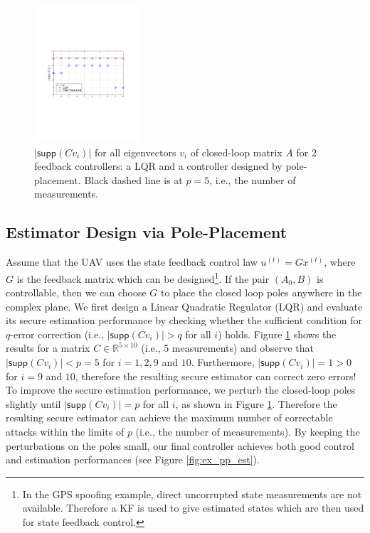 \documentclass[../../thesis.tex]{subfiles}
\begin{document}
\begin{figure}[b]
\center
\includegraphics[width=0.35\textwidth]{chapters/se_linear/figures/supp_ev_2.pdf}
\caption{$ \lvert \textsf{supp} (C v_i) \rvert $ for all eigenvectors $v_i$ of closed-loop matrix $A$ for 2 feedback controllers: a LQR and a controller designed by pole-placement. Black dashed line is at $p = 5$, i.e., the number of measurements.}
\label{fig:ex_pole}
\end{figure}

\subsection{Estimator Design via Pole-Placement}

Assume that the UAV uses the state feedback control law $u^{(t)} = G x^{(t)}$, where $G$ is the feedback matrix which can be designed\footnote{In the GPS spoofing example, direct uncorrupted state measurements are not available. Therefore a KF is used to give estimated states which are then used for state feedback control.}. If the pair $(A_0, B)$ is controllable, then we can choose $G$ to place the closed loop poles anywhere in the complex plane. We first design a Linear Quadratic Regulator (LQR) and evaluate its secure estimation performance by checking whether the sufficient condition for $q$-error correction  (i.e., $\lvert \textsf{supp} (C v_i) \rvert > q$ for all $i$) holds. 
Figure \ref{fig:ex_pole} shows the results for a matrix $C \in \mathbb{R}^{5\times 10}$ (i.e., 5 measurements) and observe that $\lvert \textsf{supp} (C v_i) \rvert < p = 5$ for $i=1,2,9$ and $10$. Furthermore, $\lvert \textsf{supp} (C v_i) \rvert = 1 > 0$ for $i = 9$ and $10$, therefore the resulting secure estimator can correct zero errors!
To improve the secure estimation performance, we perturb the closed-loop poles slightly until $\lvert \textsf{supp} (C v_i) \rvert = p$ for all $i$, as shown in Figure \ref{fig:ex_pole}. Therefore the resulting secure estimator can achieve the maximum number of correctable attacks within the limits of $p$ (i.e., the number of measurements). By keeping the perturbations on the poles small, our final controller achieves both good control and estimation performances (see Figure \ref{fig:ex_pp_est}).%
\end{document}
